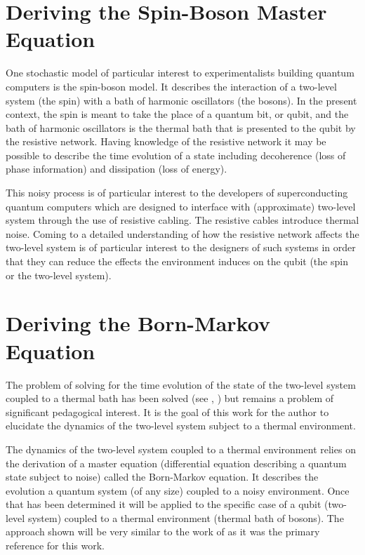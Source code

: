 \documentclass{article}
\begin{document}
\section{Deriving the Spin-Boson Master Equation}
\label{sec:deriving_the_spin_boson_master_equation}

One stochastic model of particular interest to experimentalists building quantum
computers is the spin-boson model. It describes the
interaction of a two-level system (the spin) with a bath of harmonic
oscillators (the bosons). In the present context, the spin is meant to take the place of a
quantum bit, or qubit, and the bath of harmonic oscillators is the thermal bath
that is presented to the qubit by the resistive network. Having knowledge of the
resistive network it may be possible to describe the time evolution of a state
including decoherence (loss of phase information) and dissipation (loss of
energy).

This noisy process is of particular interest to the developers of
superconducting quantum computers which are designed to interface with
(approximate) two-level system through the use of resistive cabling. The
resistive cables introduce thermal noise. Coming to a detailed understanding of
how the resistive network affects the two-level system is of particular interest
to the designers of such systems in order that they can reduce the effects the
environment induces on the qubit (the spin or the two-level system).

\section{Deriving the Born-Markov Equation}
\label{sec:deriving_the_born_markov_equation}

The problem of solving for the time evolution of the state of the two-level
system coupled to a thermal bath has been solved (see \cite{Ithier2005},
\cite{Wilhelm2006}) but remains a problem of significant pedagogical interest. It
is the goal of this work for the author to elucidate the dynamics of the
two-level system subject to a thermal environment.

The dynamics of the two-level system coupled to a thermal environment relies on
the derivation of a master equation (differential equation describing a quantum
state subject to noise) called the Born-Markov equation. It describes the
evolution a quantum system (of any size) coupled to a noisy environment. Once
that has been determined it will be applied to the specific case of a qubit
(two-level system) coupled to a thermal environment (thermal bath of bosons).
The approach shown will be very similar to the work of \cite{Goddard2010} as it
was the primary reference for this work.
\end{document}
